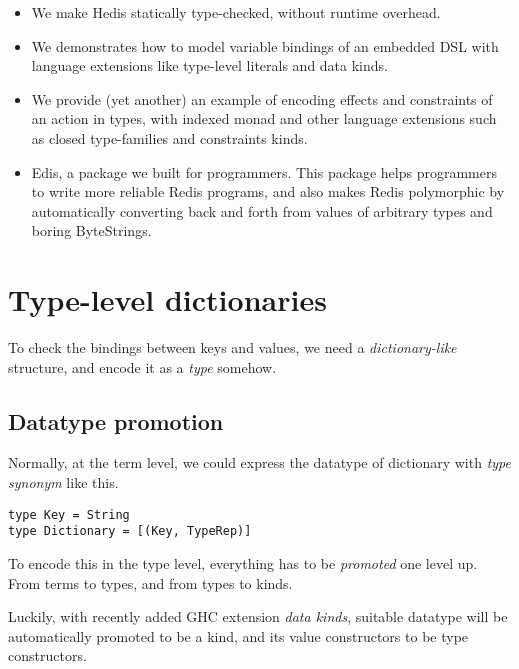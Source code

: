 \documentclass[pldi]{sigplanconf-pldi16}
\begin{document}
\begin{itemize}[noitemsep]
\item We make Hedis statically type-checked, without runtime overhead.
\item We demonstrates how to model variable bindings of an embedded DSL with
 language extensions like type-level literals and data kinds.
\item We provide (yet another) an example of encoding effects and constraints of
 an action in types, with indexed monad\cite{indexedmonad} and other language
 extensions such as closed type-families\cite{closedtypefamilies} and
 constraints kinds\cite{constraintskinds}.
\item Edis, a package we built for programmers. This package helps programmers
 to write more reliable Redis programs, and also makes Redis polymorphic by
 automatically converting back and forth from values of arbitrary types and
 boring ByteStrings.
\end{itemize}

\section{Type-level dictionaries}

To check the bindings between keys and values, we need a \emph{dictionary-like}
 structure, and encode it as a \emph{type} somehow.

\subsection{Datatype promotion}
Normally, at the term level, we could express the datatype of dictionary with
\emph{type synonym} like this.\footnotemark

\begin{verbatim}
type Key = String
type Dictionary = [(Key, TypeRep)]
\end{verbatim}


To encode this in the type level, everything has to be
 \emph{promoted}\cite{promotion} one level up.
 From terms to types, and from types to kinds.

Luckily, with recently added GHC extension \emph{data kinds}, suitable
 datatype will be automatically promoted to be a kind, and its value
 constructors to be type constructors.
\end{document}
